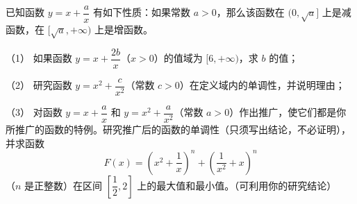 \begin{question}
已知函数 $y=x+\dfrac ax$ 有如下性质：如果常数 $a>0$，那么该函数在 $(0,\sqrt a]$ 上是减函数，在 $[\sqrt a,+\infty)$ 上是增函数。

（1） 如果函数 $y=x+\dfrac{2b}{x}$（$x>0$）的值域为 $[6,+\infty)$，求 $b$ 的值；

（2） 研究函数 $y=x^2+\dfrac c{x^2}$（常数 $c>0$）在定义域内的单调性，并说明理由；

（3） 对函数 $y=x+\dfrac ax$ 和 $y=x^2+\dfrac a{x^2}$（常数 $a>0$）作出推广，使它们都是你所推广的函数的特例。研究推广后的函数的单调性（只须写出结论，不必证明），并求函数
\nopagebreak[4]
\[
F(x)=\left(x^2+\frac1x\right)^n+
\left(\frac1{x^2}+x\right)^n
\]
（$n$ 是正整数）在区间 $\left[\dfrac12,2\right]$ 上的最大值和最小值。（可利用你的研究结论）

\end{question}